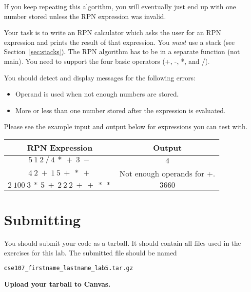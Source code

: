 \documentclass[11pt]{cselabheader}
\begin{document}
\begin{ex}
    If you keep repeating this algorithm, you will eventually just end up with
    one number stored unless the RPN expression was invalid.

    Your task is to write an RPN calculator which asks the user for an RPN
    expression and prints the result of that expression. You \emph{must} use a
    stack (see Section~\ref{sec:stacks}). The RPN algorithm has to be in a
    separate function (not main). You need to support the four basic operators
    (+, -, *, and /).

    You should detect and display messages for the following errors:
    \begin{itemize}
    \item Operand is used when not enough numbers are stored.
    \item More or less than one number stored after the expression is
      evaluated.
    \end{itemize}

    Please see the example input and output below for expressions you can test
    with.

    \begin{center}
    \begin{tabular}{cc}
      \toprule
      RPN Expression & Output\\
      \midrule
      $5~1~2~/~4~*~+~3~-$ & $4$\\
      $4~2~+~1~5~+~*~+$ & Not enough operands for +.\\
      $2~100~3~*~5~+~2~2~2~+~+~*~*$ & $3660$\\
      \bottomrule
    \end{tabular}
    \end{center}

  \end{ex}

\pagebreak
\section{Submitting}

You should submit your code as a tarball. It should contain all files
used in the exercises for this lab. The submitted file should be named
\begin{center}
  \texttt{cse107\_firstname\_lastname\_lab5.tar.gz}
\end{center}

\begin{center}
  \textbf{Upload your tarball to Canvas.}
\end{center}

\listoftheorems
\end{document}
